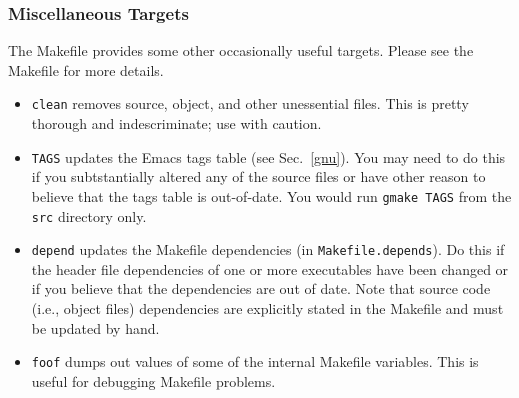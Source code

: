 \documentclass[12pt]{report}
\begin{document}
\subsubsection{Miscellaneous Targets}

The Makefile provides some other occasionally useful targets. Please
see the Makefile for more details.

\begin{itemize}
  \item {\tt clean} removes source, object, and other unessential
files. This is pretty thorough and indescriminate; use with caution.
  \item {\tt TAGS} updates the Emacs tags table (see Sec.~\ref{gnu}).
You may need to do this if you subtstantially altered any of the source
files or have other reason to believe that the tags table is out-of-date.
You would run \verb+gmake TAGS+ from the {\tt src} directory only.
  \item {\tt depend} updates the Makefile dependencies 
(in {\tt Makefile.depends}). Do this if the header file dependencies
of one or more executables have been changed or if you believe that the
dependencies are out of date. Note that source code (i.e., object files)
dependencies are
explicitly stated in the Makefile and must be updated by hand.
  \item {\tt foof} dumps out values of some of the internal Makefile
variables. This is useful for debugging Makefile problems.
\end{itemize}




\end{document}
